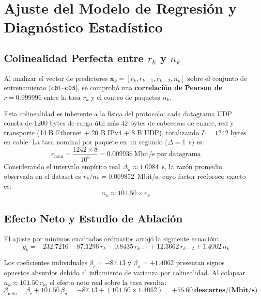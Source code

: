 \documentclass[11pt,a4paper]{article}
\begin{document}
\section{Ajuste del Modelo de Regresión y Diagnóstico Estadístico}

\subsection{\texorpdfstring{Colinealidad Perfecta entre $r_k$ y $n_k$}{Colinealidad Perfecta entre r\_k y n\_k}}
Al analizar el vector de predictores $\mathbf{x}_k = [r_k, r_{k-1}, r_{k-2}, n_k]$ sobre el conjunto de entrenamiento (\texttt{c01}--\texttt{c03}), se comprobó una \textbf{correlación de Pearson de $r = 0.999996$} entre la tasa $r_k$ y el conteo de paquetes $n_k$.

Esta colinealidad es inherente a la física del protocolo: cada datagrama UDP consta de 1200 bytes de carga útil más 42 bytes de cabeceras de enlace, red y transporte (14 B Ethernet + 20 B IPv4 + 8 B UDP), totalizando $L = 1242$ bytes en cable. La tasa nominal por paquete en un segundo ($\Delta = 1$~s) es:
\begin{equation}
    r_{\text{nom}} = \frac{1242 \times 8}{10^6} = 0.009936 \ \text{Mbit/s por datagrama}
\end{equation}
Considerando el intervalo empírico real $\Delta_k \approx 1.0084$~s, la razón promedio observada en el dataset es $r_k / n_k = 0.009852$~Mbit/s, cuyo factor recíproco exacto es:
\begin{equation}
    n_k \approx 101.50 \times r_k
\end{equation}

\subsection{Efecto Neto y Estudio de Ablación}
El ajuste por mínimos cuadrados ordinarios arrojó la siguiente ecuación:
\begin{equation}
    \hat{y}_k = -232.7216 - 87.1296\,r_k - 0.8435\,r_{k-1} + 12.3662\,r_{k-2} + 1.4062\,n_k
\end{equation}

Los coeficientes individuales $\beta_r = -87.13$ y $\beta_n = +1.4062$ presentan signos opuestos absurdos debido al inflamiento de varianza por colinealidad. Al colapsar $n_k \approx 101.50\,r_k$, el efecto neto real sobre la tasa resulta:
\begin{equation}
    \beta_{\text{neto}} = \beta_r + 101.50\,\beta_n = -87.13 + (101.50 \times 1.4062) = \mathbf{+55.60 \ \text{descartes/(Mbit/s)}}
\end{equation}
\end{document}

